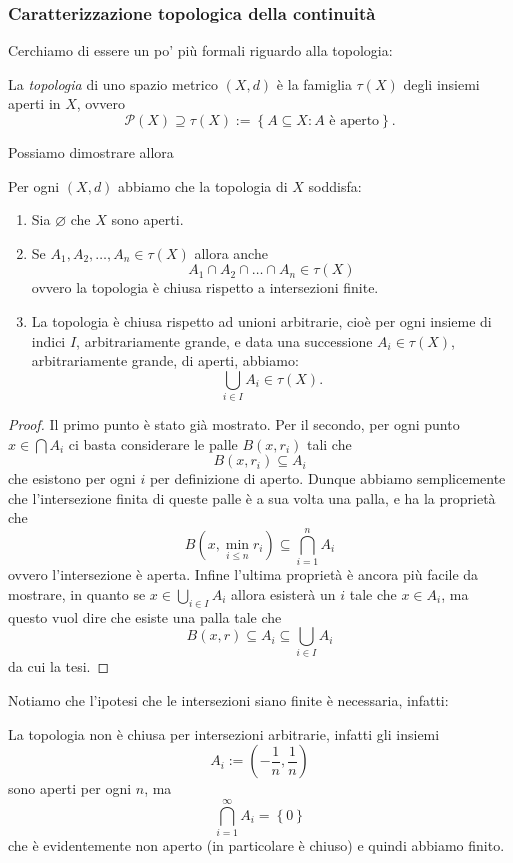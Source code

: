\documentclass[11pt]{scrartcl}
\newcommand{\eset}{\varnothing}
\newcommand{\parti}[1]{\mathcal{P}\!\left(#1\right)}
\begin{document}
	\subsubsection{Caratterizzazione topologica della continuità}
	
	Cerchiamo di essere un po' più formali riguardo alla topologia:
	\begin{definition}
		La \textit{topologia} di uno spazio metrico $(X,d)$ è la famiglia $\tau(X)$ degli insiemi aperti in $X$, ovvero
		$$\parti{X}\supseteq \tau(X):=\left\{A\subseteq X:A\text{ è aperto}\right\}.$$
	\end{definition}
	Possiamo dimostrare allora
	\begin{proposition}
		Per ogni $(X,d)$ abbiamo che la topologia di $X$ soddisfa:
		\begin{enumerate}
			\item  Sia $\eset$ che $X$ sono aperti.
			\item Se $A_1,A_2,\dots,A_n\in \tau(X)$ allora anche 
			$$A_1\cap A_2 \cap \dots \cap A_n \in \tau(X)$$
			ovvero la topologia è chiusa rispetto a intersezioni finite.
			\item La topologia è chiusa rispetto ad unioni arbitrarie, cioè per ogni insieme di indici $I$, arbitrariamente grande, e data una successione $A_i\in \tau(X)$, arbitrariamente grande, di aperti, abbiamo:
			$$\bigcup_{i\in I}A_i\in \tau(X).$$
		\end{enumerate}
	\end{proposition}
	\begin{proof}
		Il primo punto è stato già mostrato. Per il secondo, per ogni punto $x\in \bigcap A_i$ ci basta considerare le palle $B(x,r_i)$ tali che
		$$B(x,r_i)\subseteq A_i$$
		che esistono per ogni $i$ per definizione di aperto. Dunque abbiamo semplicemente che l'intersezione finita di queste palle è a sua volta una palla, e ha la proprietà che 
		$$B\left(x,\min_{i\le n} r_i\right)\subseteq \bigcap_{i=1}^n A_i$$
		ovvero l'intersezione è aperta. Infine l'ultima proprietà è ancora più facile da mostrare, in quanto se $x\in \bigcup_{i\in I} A_i$  allora esisterà un $i$ tale che $x\in A_i$, ma questo vuol dire che esiste una palla tale che
		$$B(x,r)\subseteq A_i \subseteq \bigcup_{i\in I}A_i$$
		da cui la tesi. 
	\end{proof}
	Notiamo che l'ipotesi che le intersezioni siano finite è necessaria, infatti:
	\begin{example}
		La topologia non è chiusa per intersezioni arbitrarie, infatti gli insiemi 
		$$A_i:=\left(-\frac{1}{n},\frac{1}{n}\right)$$
		sono aperti per ogni $n$, ma
		$$\bigcap_{i=1}^\infty A_i=\left\{0\right\}$$
		che è evidentemente non aperto (in particolare è chiuso) e quindi abbiamo finito.
	\end{example}
\end{document}
